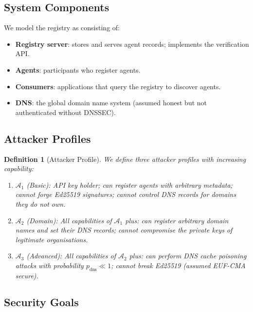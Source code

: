 \documentclass[conference]{IEEEtran}
\newtheorem{definition}{Definition}
\newcommand{\Adv}{\mathcal{A}}
\begin{document}
\subsection{System Components}

We model the registry as consisting of:
\begin{itemize}
  \item \textbf{Registry server}: stores and serves agent
    records; implements the verification API.
  \item \textbf{Agents}: participants who register agents.
  \item \textbf{Consumers}: applications that query the
    registry to discover agents.
  \item \textbf{DNS}: the global domain name system
    (assumed honest but not authenticated without DNSSEC).
\end{itemize}

\subsection{Attacker Profiles}

\begin{definition}[Attacker Profile]
We define three attacker profiles with increasing capability:
\begin{enumerate}
  \item $\Adv_1$ (Basic): API key holder; can register
    agents with arbitrary metadata; cannot forge Ed25519
    signatures; cannot control DNS records for domains they
    do not own.
  \item $\Adv_2$ (Domain): All capabilities of $\Adv_1$
    plus: can register arbitrary domain names and set their
    DNS records; cannot compromise the private keys of
    legitimate organisations.
  \item $\Adv_3$ (Advanced): All capabilities of $\Adv_2$
    plus: can perform DNS cache poisoning attacks with
    probability $p_{\text{dns}} \ll 1$; cannot break
    Ed25519 (assumed EUF-CMA secure).
\end{enumerate}
\end{definition}

\subsection{Security Goals}
\end{document}

